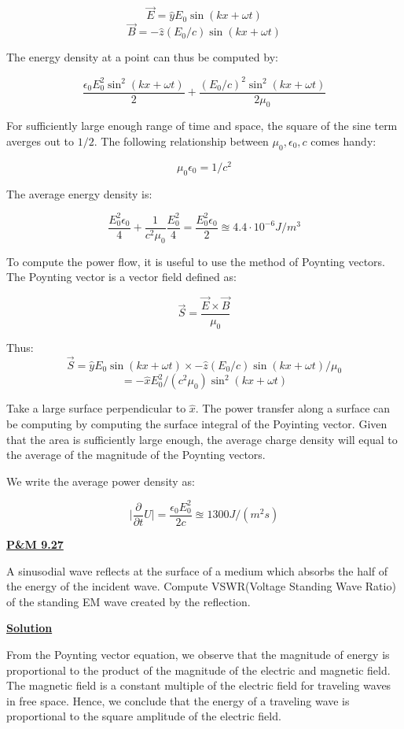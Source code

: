 \documentclass{article}
\newcommand{\new}[1]{
    \vspace{2mm}
    \noindent
    \textbf{
    \underline{#1}}
}
\newcommand{\hx}{\hat{x}}
\newcommand{\hy}{\hat{y}}
\newcommand{\hz}{\hat{z}}
\newcommand{\parderiv}[1]{{
    \frac{\partial}{\partial{#1}}
}
}
\begin{document}
\[
    \vec{E} = \hy E_0 \sin(kx + \omega t)
\]
\[
    \vec{B} = -\hz (E_0/c) \sin(kx + \omega t)
\]

The energy density at a point can thus be computed by:

\[
    \frac{
\epsilon_0
E_0^2 \sin^2(kx + \omega t)
    }
    {2}
    + 
    \frac{ 
(E_0/c)^2 \sin^2(kx + \omega t)
    }
    {2\mu_0}
\]

For sufficiently large enough range of time and space, 
the square of the sine term averges out to $1/2$. 
The following relationship between $\mu_0, \epsilon_0, c$ 
comes handy:

\[
    \mu_0\epsilon_0 = 1/c^2
\]

The average energy density is:

\[
    \frac{E_0^2\epsilon_0}{4}
    +
    \frac{1}{c^2\mu_0}
    \frac{E_0^2}{4}
    =
    \boxed{
    \frac{E_0^2 \epsilon_0} {2}
    \approxeq 
    4.4 \cdot 10^{-6} J/m^3
    }
\]

To compute the power flow, it is useful to 
use the method of Poynting vectors. The 
Poynting vector is a vector field defined as:

\[
    \vec{S} = 
    \frac{\vec{E} \times \vec{B}}
    {\mu_0}
\]

Thus:
\[
    \vec{S} = \hy E_0 \sin(kx + \omega t) \times 
    -\hz (E_0/c) \sin(kx + \omega t)
    /\mu_0
\]
\[
    = -\hx E_0^2/(c^2\mu_0) \sin^2(kx + \omega t)
\]

Take a large surface perpendicular to $\hx$. 
The power transfer along a surface can be computing 
by computing the surface integral of the Poyinting 
vector. 
Given that the area is sufficiently large enough, 
the average charge density will equal to the average 
of the magnitude of the Poynting vectors. 

We write the average power density as:

\[
    \boxed{
    \bigg|\parderiv{t}U\bigg| = \frac{\epsilon_0 E_0^2}{2c}
\approxeq 1300 J/(m^2s)
    }
\]

\newpage

\new{P\&M 9.27}
A sinusodial wave reflects at the surface of a medium which 
absorbs the half of the energy of the incident wave. 
Compute VSWR(Voltage Standing Wave Ratio) of the standing 
EM wave created by the reflection. 

\new{Solution}
From the Poynting vector equation, we observe that the magnitude 
of energy is proportional to the product of the magnitude of 
the electric and magnetic field. The magnetic field is a constant 
multiple of the electric field for traveling waves in free space. 
Hence, we conclude that the energy of a traveling wave is proportional 
to the square amplitude of the electric field. 
\end{document}
